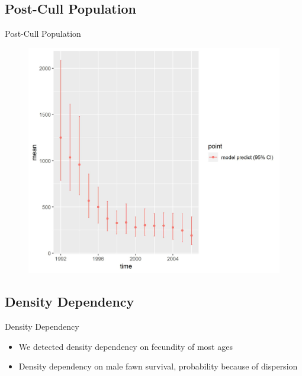 \documentclass{beamer}
\begin{document}
\subsection{Post-Cull Population}
\begin{frame}{Post-Cull Population}
	\begin{figure}[ht]
		\centering
		\includegraphics[scale=.45]{fig/Chicago_deer/living_af_culling_all1.jpg}
		\label{postcull}
	\end{figure}
\end{frame}

\subsection{Density Dependency}
\begin{frame}{Density Dependency}
	\begin{itemize}
		\item We detected density dependency on fecundity of most ages
		\item Density dependency on male fawn survival, probability because of dispersion
	\end{itemize}
\end{frame}
\end{document}
